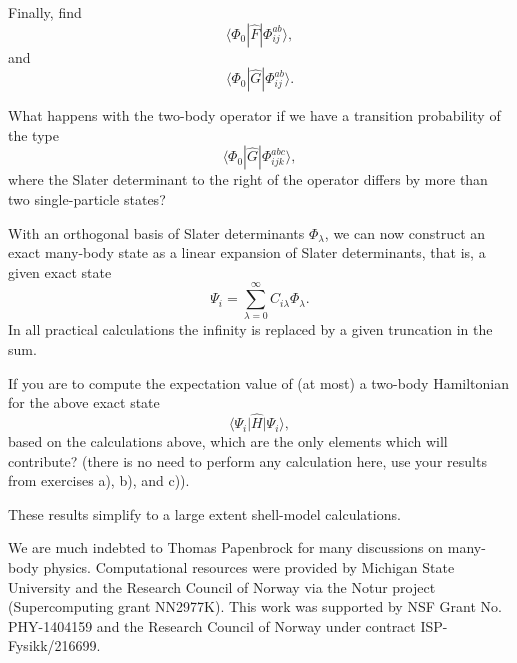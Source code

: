 \begin{prob}
Finally, find
\[
\langle \Phi_0 |\hat{F}|\Phi_{ij}^{ab}\rangle,
\]
and
\[
\langle \Phi_0|\hat{G}|\Phi_{ij}^{ab}\rangle.
\]

What happens with the two-body operator if we have a transition probability  of the type
\[
\langle \Phi_0|\hat{G}|\Phi_{ijk}^{abc}\rangle,
\]
where the Slater determinant to the right of the operator differs by more than two single-particle states?

With an orthogonal basis of Slater determinants $\Phi_{\lambda}$, we can now construct an exact many-body state as a linear expansion of Slater determinants, that is, a given exact state
\[
\Psi_i = \sum_{\lambda =0}^{\infty}C_{i\lambda}\Phi_{\lambda}.
\]
In all practical calculations the infinity is replaced by a given truncation in the sum. 

If you are to compute the expectation value of (at most) a two-body Hamiltonian for the above
exact state
\[
\langle \Psi_i \vert \hat{H} \vert \Psi_i\rangle,
\]
based on the calculations above, which are the only elements which will contribute?  (there is no need to perform any calculation here, use your results from exercises a), b), and c)).

These results simplify to a large extent shell-model calculations. 
\end{prob}


\begin{acknowledgement}
We are much indebted to Thomas Papenbrock for many discussions on many-body physics.
Computational resources were provided by Michigan State University and the Research Council of Norway via the Notur project (Supercomputing grant NN2977K).
This work was supported by NSF Grant No. PHY-1404159 and  the Research Council of Norway under contract ISP-Fysikk/216699.
\end{acknowledgement}







